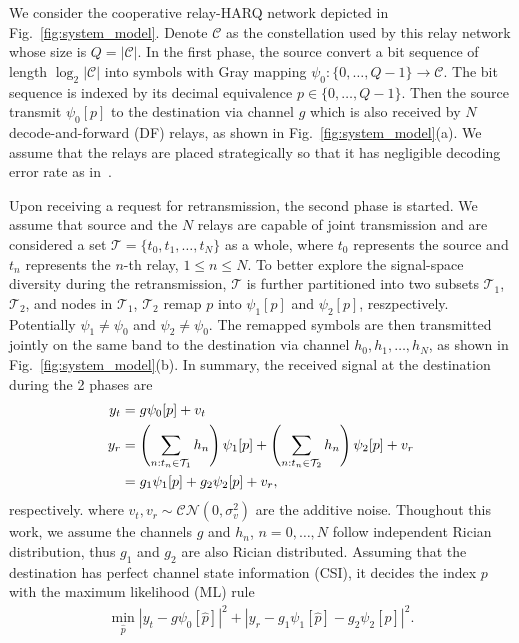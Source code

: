 \documentclass[conference]{IEEEtran}
\begin{document}
We consider the cooperative relay-HARQ network depicted in
Fig.~\ref{fig:system_model}. Denote $\mathcal{C}$ as the constellation used by
this relay network whose size is $Q=|\mathcal{C}|$. In
the first phase, the source convert a bit sequence of length
$\log_2|\mathcal{C}|$ into symbols with Gray mapping $\psi_0:
\{0,\ldots,Q - 1\}\rightarrow \mathcal{C}$. The bit sequence is
indexed by its decimal equivalence $p\in \{0,\ldots,Q - 1\}$.
Then the source transmit $\psi_0[p]$ to the destination via channel $g$
which is also received by $N$ decode-and-forward (DF) relays, as shown in
Fig.~\ref{fig:system_model}(a).
We assume that the relays are placed strategically so that it has
negligible decoding error rate as in~\cite{}. 

Upon receiving a request for retransmission, the second phase is started. We
assume that source and the $N$ relays are capable of joint transmission and are
considered a set $\mathcal{T} = \{t_0,t_1,\ldots,t_N\}$ as a
whole, where $t_0$ represents the source and $t_n$ represents the
$n$-th relay, $1\leq n\leq N$. To better explore the signal-space diversity
during the retransmission, $\mathcal{T}$ is further partitioned into two subsets
$\mathcal{T}_1$, $\mathcal{T}_2$, and nodes in $\mathcal{T}_1$, $\mathcal{T}_2$
remap $p$ into $\psi_1[p]$ and $\psi_2[p]$, reszpectively. Potentially
$\psi_1\not=\psi_0$ and $\psi_2\not=\psi_0$. The remapped symbols are then
transmitted jointly on the same band to the destination via channel $h_0,
h_1,\ldots, h_N$, as shown in Fig.~\ref{fig:system_model}(b). In summary, the
received signal at the destination during the 2 phases are
\begin{subequations}
    \begin{align}
       y_t & = g\psi_0[p] + v_t \\
       y_r & = \left(\sum_{n:t_n\in\mathcal{T}_1}h_n\right)\psi_1[p] +
       \left(\sum_{n:t_n\in\mathcal{T}_2}h_n\right)\psi_2[p] + v_r \notag \\
       & = g_1\psi_1[p] + g_2\psi_2[p] + v_r,
    \end{align}
\end{subequations}
respectively. where $v_t, v_r\sim\mathcal{CN}(0,\sigma_v^2)$ are the additive
noise. Thoughout this work, we assume the channels $g$ and $h_n$, $n=0,\ldots,
N$ follow independent Rician distribution, thus $g_1$ and $g_2$ are also Rician
distributed.%
Assuming that the destination has perfect channel state information (CSI), it
decides the index $p$ with the maximum likelihood (ML) rule
\begin{align}
    \min_{\hat{p}} |y_t - g\psi_0[\hat{p}]|^2 + |y_r-
    g_1\psi_1[\hat{p}] - g_2\psi_2[\hat{p}]|^2.
    \label{eq:ML}
\end{align}
\end{document}

